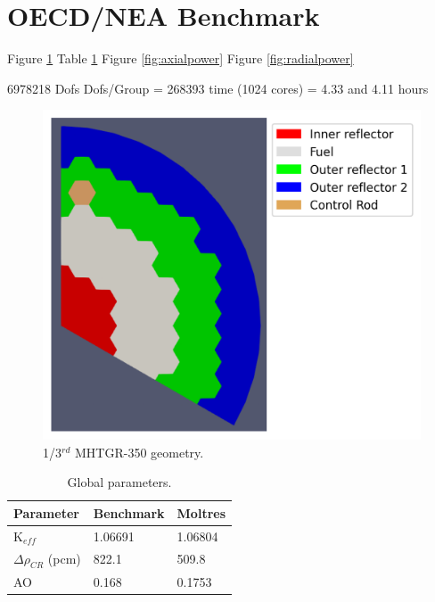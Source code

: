 \documentclass[11pt,letterpaper]{article}
\begin{document}
\section{OECD/NEA Benchmark}

Figure \ref{fig:mesh}
Table \ref{tab:globalparam}
Figure \ref{fig:axialpower}
Figure \ref{fig:radialpower}

6978218 Dofs
Dofs/Group = 268393
time (1024 cores) = 4.33 and 4.11 hours

\begin{figure}[htbp!]
	\centering
	\includegraphics[width=0.6\linewidth]{figures/oecd-fullcore-legend}
	\hfill
	\caption{1/3$^{rd}$ MHTGR-350 geometry.}
	\label{fig:mesh}
\end{figure}

\begin{table}[htbp!]
  \centering
  \caption{Global parameters.}
  \begin{tabular}{l|l|l}
  \toprule
  Parameter &  Benchmark  &  Moltres    \\
  \midrule
  K$_{eff}$ &  1.06691    &  1.06804    \\
  $\Delta \rho_{CR}$ (pcm)  & 822.1 & 509.8 \\
  AO        &  0.168      &  0.1753     \\
  \bottomrule
  \end{tabular}
  \label{tab:globalparam}
\end{table}
\end{document}

